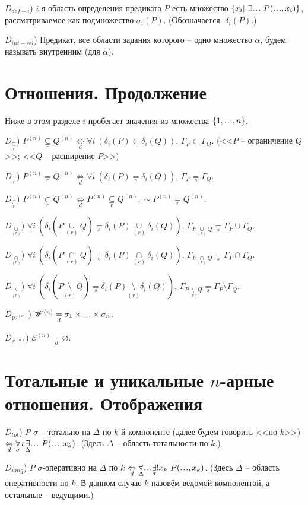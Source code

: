 \documentclass[a4paper]{article}
\newcommand\mydots{\hbox to 1em{.\hss.\hss.}}
\newcommand{\Def}[0]{\underset{d}{\Leftrightarrow}}
\newcommand{\defeq}[0]{\underset{d}{=}}
\newcommand{\eqs}[0]{\underset{s}{=}}
\newcommand{\eqr}[0]{\underset{r}{=}}
\newcommand{\subsetr}[0]{\underset{r}{\subset}}
\newcommand{\subseteqr}[0]{\underset{r}{\subseteq}}
\newcommand{\capr}[0]{\underset{(r)}{\cap}}
\newcommand{\cupr}[0]{\underset{(r)}{\cup}}
\newcommand{\setminusr}[0]{\underset{(r)}{\setminus}}
\begin{document}
$D_{def-i}$) $i$-я область определения предиката $P$ есть множество $\{x_i|~\exists \mydots~P(\mydots, x_i)\}$, рассматриваемое как подмножество $\sigma_i(P)$. (Обозначается: $\delta_i(P)$.)

$D_{int-rel}$) Предикат, все области задания которого -- одно множество $\alpha$, будем называть внутренним (для $\alpha$).

\section{Отношения. Продолжение}

Ниже в этом разделе $i$ пробегает значения из множества $\{1, \mydots, n\}$.

$D_{\subseteqr}$) $P^{(n)} \subseteqr Q^{(n)} \Def \forall i~(\delta_i(P) \subset \delta_i(Q))$, $\Gamma_P \subset \Gamma_Q$. (<<$P$ -- ограничение $Q$>>; <<$Q$ -- расширение $P$>>)

$D_{\eqr}$) $P^{(n)} \eqr Q^{(n)} \Def \forall i~(\delta_i(P) \eqs \delta_i(Q))$, $\Gamma_P \eqs \Gamma_Q$.

$D_{\subsetr}$) $P^{(n)} \subsetr Q^{(n)} \Def P^{(n)} \subseteqr Q^{(n)}, \sim P^{(n)} \eqr Q^{(n)}$.

$D_{\cupr}$) $\forall i~(\delta_i(P \cupr Q) \eqs \delta_i(P) \cupr \delta_i(Q))$, $\Gamma_{P \cupr Q} \eqs \Gamma_P \cup \Gamma_Q$.

$D_{\capr}$) $\forall i~(\delta_i(P \capr Q) \eqs \delta_i(P) \capr \delta_i(Q))$, $\Gamma_{P \capr Q} \eqs \Gamma_P \cap \Gamma_Q$.

$D_{\setminusr}$) $\forall i~(\delta_i(P \setminusr Q) \eqs \delta_i(P) \setminusr \delta_i(Q))$, $\Gamma_{P \setminusr Q} \eqs \Gamma_P \setminus \Gamma_Q$.

$D_{\mathscr{W}^{(n)}}$) $\mathscr{W}^{(n)} \defeq \sigma_1 \times \mydots \times \sigma_n$.

$D_{\mathscr{E}^{(n)}}$) $\mathscr{E}^{(n)} \defeq \varnothing$.

\section{Тотальные и уникальные $n$-арные отношения. Отображения}

$D_{tot}$) $P$ $\sigma$ -- тотально на $\Delta$ по $k$-й компоненте (далее будем говорить <<по $k$>>) $\Def \underset{\sigma}{\forall} x \underset{\Delta}{\exists} \mydots~P(\mydots, x_k)$. (Здесь $\Delta$ -- область тотальности по $k$.)

$D_{uniq}$) $P$ $\sigma$-оперативно на $\Delta$ по $k$ $\Def \underset{\Delta}{\forall} \mydots \underset{\sigma}{\exists}! x_k~P(\mydots, x_k)$. (Здесь $\Delta$ -- область оперативности по $k$. В данном случае $k$ назовём ведомой компонентой, а остальные -- ведущими.)
\end{document}
